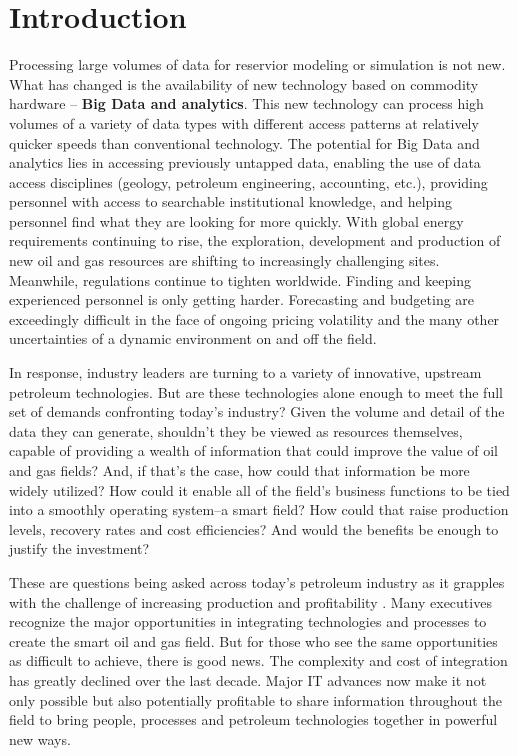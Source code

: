 \documentclass[twocolumn]{article}
\begin{document}
\section{Introduction}
Processing large volumes of data for reservior modeling or simulation is not new. What has changed is the availability of new technology based on commodity hardware -- \textbf{Big Data and analytics}. This new technology can process high volumes of a variety of data types with different access patterns at relatively quicker speeds than conventional technology.
The potential for Big Data and analytics lies in accessing previously untapped data, enabling the use of data access disciplines (geology, petroleum engineering, accounting, etc.), providing personnel with access to searchable institutional knowledge, and helping personnel find what they are looking for more quickly. 
With global energy requirements continuing to rise, the exploration, development and production of new oil and
gas resources are shifting to increasingly challenging sites. Meanwhile, regulations continue to tighten worldwide. Finding and keeping experienced personnel is only getting harder. Forecasting and budgeting are exceedingly difficult in the face of ongoing pricing volatility and the many other uncertainties of a dynamic environment on and off the field.

In response, industry leaders are turning to a variety of innovative, upstream petroleum technologies. But are these technologies alone enough to meet the full set of demands confronting today’s industry? Given the volume and detail
of the data they can generate, shouldn’t they be viewed as resources themselves, capable of providing a wealth of information that could improve the value of oil and gas fields? And, if that’s the case, how could that information be more widely utilized? How could it enable all of the field’s business functions to be tied into a smoothly operating system–a smart field? How could that raise production levels, recovery rates and cost efficiencies? And would the benefits be enough to justify the investment?

These are questions being asked across today’s petroleum industry as it grapples with the challenge of increasing production and profitability \cite{IDCHDS:2012}. Many executives recognize the major opportunities in integrating technologies and processes to create the smart oil and gas field. But for those who see the same opportunities as difficult to achieve, there is good news. The complexity and cost of integration has greatly declined over the last decade. Major IT advances now make it not only possible but also potentially profitable to share information throughout the field to bring people, processes and petroleum technologies together in powerful new ways.
\end{document}
